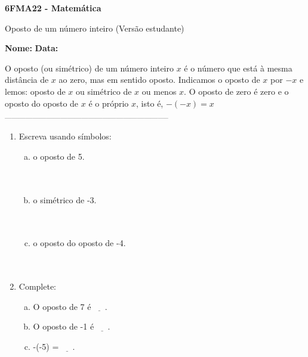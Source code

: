\documentclass[a4paper,14pt]{article}
\begin{document}
	
	\noindent\textbf{6FMA22 - Matemática} 
	
	\begin{center}Oposto de um número inteiro (Versão estudante)
	\end{center}
	
	\noindent\textbf{Nome:} \underline{\hspace{10cm}}
	\noindent\textbf{Data:} \underline{\hspace{4cm}}
	
	
	\begin{multicols}{2}
		\noindent O oposto (ou simétrico) de um número inteiro $x$ é o número que está à mesma distância de $x$ ao zero, mas em sentido oposto. Indicamos o oposto de $x$ por $-x$ e lemos: oposto de $x$ ou simétrico de $x$ ou menos $x$. O oposto de zero é zero e o oposto do oposto de $x$ é o próprio $x$, isto é, $-(-x) = x$ \\
		\noindent\textsubscript{-----------------------------------------------------------------------}
		\begin{enumerate} 
			\item Escreva usando símbolos:
			\begin{enumerate}[a)] 
				\item o oposto de 5. \\\\\\
				\item o simétrico de -3. \\\\\\
				\item o oposto do oposto de -4. \\\\\\
			\end{enumerate}
			\item Complete:
			\begin{enumerate}[a)] 
				\item O oposto de 7 é $\underline{~~~~~~}$. \\
				\item O oposto de -1 é $\underline{~~~~~~}$. \\
				\item -(-5) = $\underline{~~~~~~}$. \\

\end{enumerate}
\end{enumerate}
\end{multicols}
\end{document}
